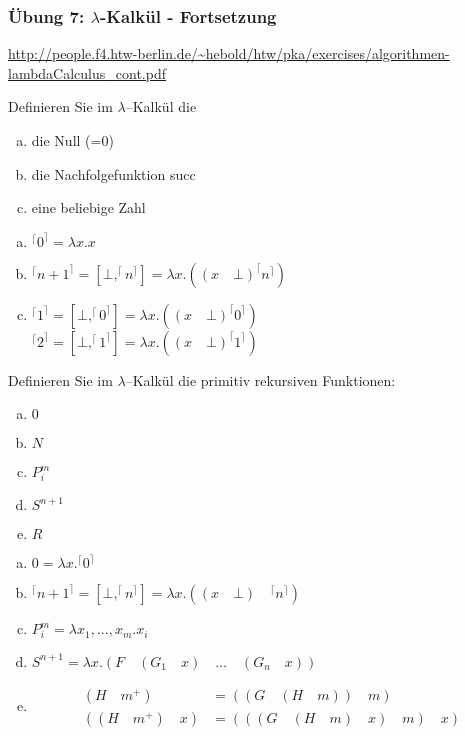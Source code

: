 \begin{card}
	\frametitle{Übung 7: $\lambda$-Kalkül - Fortsetzung}
	\url{http://people.f4.htw-berlin.de/~hebold/htw/pka/exercises/algorithmen-lambdaCalculus_cont.pdf}
\end{card}

\begin{card}
	Definieren Sie im $\lambda$–Kalkül die
	\begin{enumerate}[a)]
    \item die Null (=0)
    \item die Nachfolgefunktion succ
    \item eine beliebige Zahl
	\end{enumerate}
	\hr
	\begin{enumerate}[a)]
    \item $^\lceil 0 ^\rceil = \lambda x.x$
    \item $^\lceil n+1 ^\rceil = [\bot, ^\lceil n ^\rceil] = \lambda x.((x \quad \bot) ^\lceil n ^\rceil)$
    \item $^\lceil 1 ^\rceil = [\bot, ^\lceil 0 ^\rceil] = \lambda x.((x \quad \bot) ^\lceil 0 ^\rceil)$\\
        $^\lceil 2 ^\rceil = [\bot, ^\lceil 1 ^\rceil] = \lambda x.((x \quad \bot) ^\lceil 1 ^\rceil)$
	\end{enumerate}
\end{card}

\begin{card}
	Definieren Sie im $\lambda$–Kalkül die primitiv rekursiven Funktionen:
	\begin{enumerate}[a)]
    \item $0$
    \item $N$
    \item $P^m_i$
    \item $S^{n+1}$
    \item $R$
	\end{enumerate}
	\hr
	\begin{enumerate}[a)]
    \item $0 = \lambda x.^\lceil 0 ^\rceil$
    \item $^\lceil n+1 ^\rceil = [\bot, ^\lceil n ^\rceil] = \lambda x.((x \quad \bot) \quad ^\lceil n ^\rceil)$\\
    \item $P^m_i = \lambda x_1,...,x_m.x_i$
    \item $S^{n+1} = \lambda x.(F \quad (G_1 \quad x) \quad \ldots \quad (G_n \quad x))$
    \item
      \begin{align*}
        (H \quad m^+) &= ((G \quad (H \quad m)) \quad m) \\
        ((H \quad m^+) \quad x) &= (((G \quad (H \quad m) \quad x) \quad m) \quad x)
      \end{align*}
	\end{enumerate}
\end{card}


